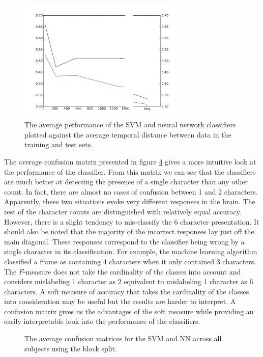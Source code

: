 \documentclass[preprint,authoryear,12pt]{elsarticle}
\begin{document}
\begin{figure}
\centering
\includegraphics[width=0.7\textwidth]{figures/performance-verse-temporal-distance}
\caption{The average performance of the SVM and neural network classifiers plotted against the average temporal distance between data in the training and test sets.}
\label{fig:performance-verse-temporal-distance}
\end{figure}

The average confusion matrix presented in figure \ref{fig:average-confusion} gives a more intuitive look at the performance of the classifier.
From this matrix we can see that the classifiers are much better at detecting the presence of a single character than any other count.
In fact, there are almost no cases of confusion between 1 and 2 characters.
Apparently, these two situations evoke very different responses in the brain.
The rest of the character counts are distinguished with relatively equal accuracy.
However, there is a slight tendency to mis-classify the 6 character presentation.
It should also be noted that the majority of the incorrect responses lay just off the main diagonal.
These responses correspond to the classifier being wrong by a single character in its classification.
For example, the machine learning algorithm classified a frame as containing 4 characters when it only contained 3 characters.
The $F$-measure does not take the cardinality of the classes into account and considers mislabeling 1 character as 2 equivalent to mislabeling 1 character as 6 characters.
A soft measure of accuracy that takes the cardinality of the classes into consideration may be useful but the results are harder to interpret.
A confusion matrix gives us the advantages of the soft measure while providing an easily interpretable look into the performance of the classifiers.

\begin{figure}
\centering
\begin{subfigure}{\textwidth}
\centering

\caption{}
\label{fig:average-confusion-svm}
\end{subfigure}
\begin{subfigure}{\textwidth}
\centering

\caption{}
\label{fig:average-confusion-nn}
\end{subfigure}
\caption{The average confusion matrices for the  SVM and  NN across all subjects using the block split.}
\label{fig:average-confusion}
\end{figure}
\end{document}
